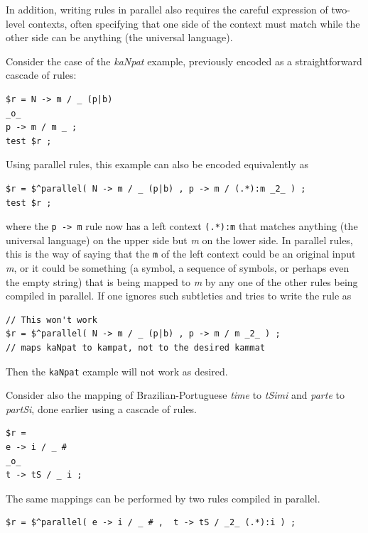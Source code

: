 	In addition,
writing rules in parallel
also requires the careful expression of two-level contexts, often specifying that one side
of the context must match while the other side can be anything (the universal language).

Consider the case of the \emph{kaNpat} example, previously encoded as a
straightforward cascade of
rules:

\begin{Verbatim}
$r = N -> m / _ (p|b)
_o_
p -> m / m _ ;
test $r ;
\end{Verbatim}

\noindent
Using parallel rules, this example can also be encoded equivalently as

\begin{Verbatim}
$r = $^parallel( N -> m / _ (p|b) , p -> m / (.*):m _2_ ) ;
test $r ;
\end{Verbatim}

\noindent
where the \texttt{p -> m} rule now has a left context \texttt{(.*):m} that matches
anything (the universal language) on the upper side but \emph{m} on the lower
side.  In parallel rules, this is the way of saying that the \texttt{m} of the left context could
be an original input \emph{m}, or it could be something (a symbol, a sequence of symbols,
or perhaps even the empty string) that is being mapped to \emph{m} by
any one of the other rules
being compiled in parallel.  If one ignores such subtleties and tries to write the
rule as

\begin{Verbatim}
// This won't work
$r = $^parallel( N -> m / _ (p|b) , p -> m / m _2_ ) ;
// maps kaNpat to kampat, not to the desired kammat
\end{Verbatim}

\noindent
Then the \texttt{kaNpat} example will not work as desired.


Consider also the mapping of Brazilian-Portuguese \emph{time} to \emph{tSimi} and \emph{parte} to \emph{partSi}, done earlier using a cascade of rules.  


\begin{Verbatim}
$r = 
e -> i / _ #
_o_
t -> tS / _ i ;
\end{Verbatim}

\noindent
The same mappings can be performed by two rules compiled in parallel.

\begin{Verbatim}
$r = $^parallel( e -> i / _ # ,  t -> tS / _2_ (.*):i ) ;
\end{Verbatim}

